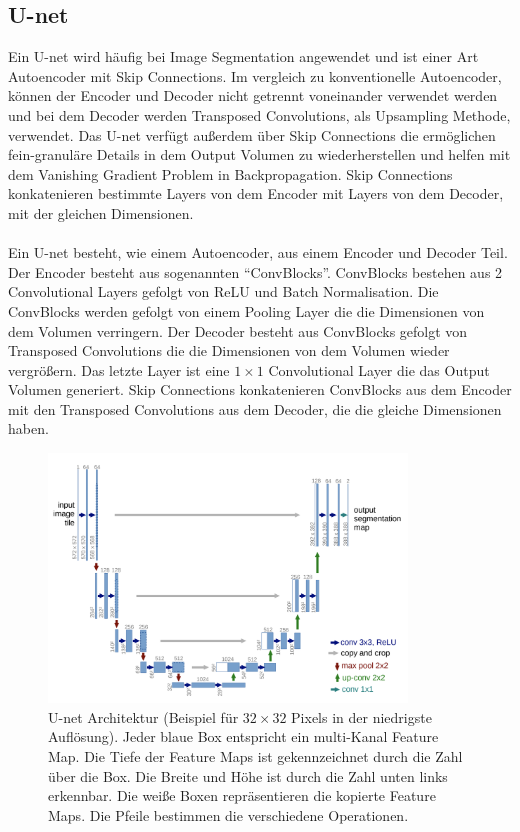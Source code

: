 \subsection{U-net}\label{section:u-net}
Ein U-net wird häufig bei Image Segmentation angewendet und ist einer Art Autoencoder mit Skip Connections. Im vergleich zu konventionelle Autoencoder, können
der Encoder und Decoder nicht getrennt voneinander verwendet werden und bei dem Decoder werden Transposed Convolutions, als Upsampling 
Methode, verwendet. Das U-net verfügt außerdem über Skip Connections die ermöglichen fein-granuläre Details in dem Output Volumen zu 
wiederherstellen und helfen mit dem Vanishing Gradient Problem in Backpropagation. Skip Connections konkatenieren bestimmte Layers von dem
Encoder mit Layers von dem Decoder, mit der gleichen Dimensionen.
\\
\\
Ein U-net besteht, wie einem Autoencoder, aus einem Encoder und Decoder Teil. Der Encoder besteht aus sogenannten ``ConvBlocks''. ConvBlocks
bestehen aus 2 Convolutional Layers gefolgt von ReLU und Batch Normalisation. Die ConvBlocks werden gefolgt
von einem Pooling Layer die die Dimensionen von dem Volumen verringern. Der Decoder besteht aus ConvBlocks gefolgt von Transposed Convolutions
die die Dimensionen von dem Volumen wieder vergrößern. Das letzte Layer ist eine $1 \times 1$ Convolutional Layer die das Output Volumen generiert.
Skip Connections konkatenieren ConvBlocks aus dem Encoder mit den Transposed Convolutions aus dem Decoder, die die gleiche Dimensionen haben.

\begin{figure}[H]
  \centering
  \includegraphics[width=0.85\textwidth]{resources/networks/unet.png}
  \caption{
    U-net Architektur (Beispiel für $32 \times 32$ Pixels in der niedrigste Auflösung). Jeder blaue Box entspricht ein multi-Kanal Feature Map.
    Die Tiefe der Feature Maps ist gekennzeichnet durch die Zahl über die Box. Die Breite und Höhe ist durch die Zahl unten links erkennbar.
    Die weiße Boxen repräsentieren die kopierte Feature Maps. Die Pfeile bestimmen die verschiedene Operationen.
    \cite{ronneberger2015unet}
  }
  \label{image:unet}
\end{figure}

